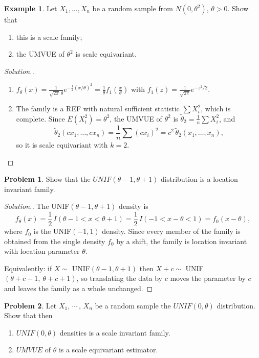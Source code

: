 \documentclass[12pt,a4paper]{report}
\theoremstyle{definition}
\newtheorem{exa}[thm]{Example}
\newtheorem{problemx}{Problem}[section]
\newenvironment{problem}{\begin{problemx}}{\end{problemx}}
\newenvironment{solution}
  {\renewcommand{\qedsymbol}{}\begin{proof}[\textit{Solution}.]}
  {\end{proof}}
\begin{document}
\begin{exa}
\label{ex:normalscale}
Let $X_1, \dots, X_n$ be a random sample from $N(0, \theta^2)$, $\theta>0$. Show that
\begin{enumerate}
\item[(a)] this is a scale family;
\item[(b)] the UMVUE of $\theta^2$ is scale equivariant.
\end{enumerate}
\end{exa}

\begin{solution}
\begin{enumerate}
\item[(a)] $f_\theta(x) = \frac{1}{\sqrt{2\pi}\,\theta}e^{-\frac12(x/\theta)^2}
= \frac1\theta f_1\left(\frac x\theta\right)$ with $f_1(z) = \frac{1}{\sqrt{2\pi}}e^{-z^2/2}$.
\item[(b)] The family is a REF with natural sufficient statistic $\sum X_i^2$, which
is complete. Since $E(X_i^2) = \theta^2$, the UMVUE of $\theta^2$ is
$\tilde\theta_2 = \frac1n\sum X_i^2$, and
\[\tilde\theta_2(cx_1, \dots, cx_n) = \frac1n\sum(cx_i)^2 = c^2\,\tilde\theta_2(x_1, \dots, x_n),\]
so it is scale equivariant with $k = 2$.
\end{enumerate}
\end{solution}

\begin{problem}
Show that the $UNIF(\theta - 1, \theta + 1)$ distribution is a location invariant family.
\end{problem}

\begin{solution}
The UNIF$(\theta-1,\theta+1)$ density is
\[f_{\theta}(x) = \frac12\,I\left(\theta-1<x<\theta+1\right)
= \frac12\,I\left(-1<x-\theta<1\right) = f_0(x-\theta),\]
where $f_0$ is the UNIF$(-1,1)$ density. Since every member of the family is
obtained from the single density $f_0$ by a shift, the family is location
invariant with location parameter $\theta$.

Equivalently: if $X\sim$ UNIF$(\theta-1,\theta+1)$ then $X+c\sim$
UNIF$(\theta+c-1,\ \theta+c+1)$, so translating the data by $c$ moves the
parameter by $c$ and leaves the family as a whole unchanged.
\end{solution}

\begin{problem}
Let $X_1, \, \cdots\, , \, X_n$ be a random sample the $UNIF(0,\theta)$ distribution. Show that then
\begin{enumerate}
\item[(a)] $UNIF(0,\theta)$ densities is a scale invariant family.
\item[(b)] $UMVUE$ of $\theta$ is a scale equivariant estimator.
\end{enumerate}
\end{problem}
\end{document}
